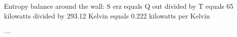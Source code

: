 Entropy balance around the wall:  
S erz equals Q out divided by T equals 65 kilowatts divided by 293.12 Kelvin equals 0.222 kilowatts per Kelvin  

---